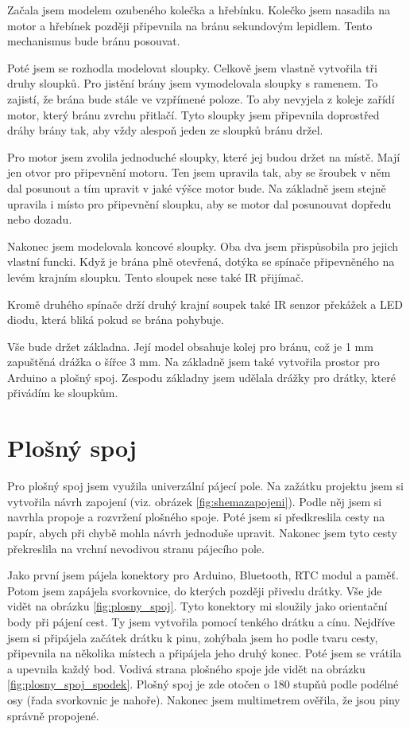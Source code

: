 \documentclass[12pt, a4paper,
twoside,        %
openright
]{report}
\begin{document}
	Začala jsem modelem ozubeného kolečka a hřebínku. Kolečko jsem nasadila na motor a hřebínek později připevnila na bránu sekundovým lepidlem. Tento mechanismus bude bránu posouvat. 
	
	Poté jsem se rozhodla modelovat sloupky. Celkově jsem vlastně vytvořila tři druhy sloupků. 
	Pro jistění brány jsem vymodelovala sloupky s ramenem. To zajistí, že brána bude stále ve vzpřímené poloze. To aby nevyjela z koleje zařídí motor, který bránu zvrchu přitlačí. Tyto sloupky jsem připevnila doprostřed dráhy brány tak, aby vždy alespoň jeden ze sloupků bránu držel.
	
	Pro motor jsem zvolila jednoduché sloupky, které jej budou držet na místě. Mají jen otvor pro připevnění motoru. Ten jsem upravila tak, aby se šroubek v něm dal posunout a tím upravit v jaké výšce motor bude. Na základně jsem stejně upravila i místo pro připevnění sloupku, aby se motor dal posunouvat dopředu nebo dozadu.
	
	Nakonec jsem modelovala koncové sloupky. Oba dva jsem přispůsobila pro jejich vlastní funcki. Když je brána plně otevřená, dotýka se spínače připevněného na levém krajním sloupku. Tento sloupek nese také IR přijímač.
	
	Kromě druhého spínače drží druhý krajní soupek také IR senzor překážek a LED diodu, která bliká pokud se brána pohybuje. 
	
	Vše bude držet základna. Její model obsahuje kolej pro bránu, což je 1 mm zapuštěná drážka o šířce 3 mm. Na základně jsem také vytvořila prostor pro Arduino a plošný spoj. Zespodu základny jsem udělala drážky pro drátky, které přivádím ke sloupkům.
	
	
	
	\section{Plošný spoj}
	Pro plošný spoj jsem využila univerzální pájecí pole. Na zažátku projektu jsem si vytvořila návrh zapojení (viz. obrázek \ref{fig:shemazapojeni}). Podle něj jsem si navrhla propoje a rozvržení plošného spoje. Poté jsem si předkreslila cesty na papír, abych při chybě mohla návrh jednoduše upravit. Nakonec jsem tyto cesty překreslila na vrchní nevodivou stranu pájecího pole.
	
	Jako první jsem pájela konektory pro Arduino, Bluetooth, RTC modul a paměť. Potom jsem zapájela svorkovnice, do kterých později přivedu drátky. Vše jde vidět na obrázku \ref{fig:plosny_spoj}. Tyto konektory mi sloužily jako orientační body při pájení cest.
	Ty jsem vytvořila pomocí tenkého drátku a cínu. Nejdříve jsem si připájela začátek drátku k pinu, zohýbala jsem ho podle tvaru cesty, připevnila na několika místech a připájela jeho druhý konec. Poté jsem se vrátila a upevnila každý bod. Vodivá strana plošného spoje jde vidět na obrázku \ref{fig:plosny_spoj_spodek}. Plošný spoj je zde otočen o 180 stupňů podle podélné osy (řada svorkovnic je nahoře). Nakonec jsem multimetrem ověřila, že jsou piny správně propojené.
	
\end{document}
